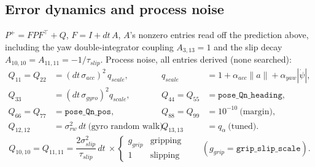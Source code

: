 \documentclass[11pt]{article}
\begin{document}
\subsection{Error dynamics and process noise}
$P^+ = FPF^\top + Q$, $F = I + dt\,A$, $A$'s nonzero entries read off the prediction
above, including the yaw double-integrator coupling $A_{3,13}=1$ and the slip decay
$A_{10,10}=A_{11,11}=-1/\tau_{slip}$. Process noise, all entries derived (none searched):
\begin{align}
Q_{11}=Q_{22} &= (dt\,\sigma_{acc})^2\,q_{scale}, &
q_{scale} &= 1+\alpha_{acc}\|a\|+\alpha_{yaw}|\dot\psi|,\\
Q_{33} &= (dt\,\sigma_{gyro})^2 q_{scale}, &
Q_{44}=Q_{55} &= \texttt{pose\_Qn\_heading},\\
Q_{66}=Q_{77} &= \texttt{pose\_Qn\_pos}, &
Q_{88}=Q_{99} &= 10^{-10}\ \text{(margin)},\\
Q_{12,12} &= \sigma_{rw}^2\,dt\ \text{(gyro random walk)}, &
Q_{13,13} &= q_\alpha\ \text{(tuned)} .
\end{align}
\begin{equation}
Q_{10,10}=Q_{11,11} = \frac{2\sigma_{slip}^2}{\tau_{slip}}\,dt\ \times
\begin{cases}g_{grip}&\text{gripping}\\1&\text{slipping}\end{cases}
\qquad (g_{grip}=\texttt{grip\_slip\_scale}).
\end{equation}
\end{document}
